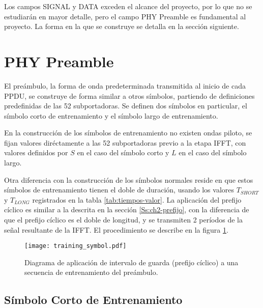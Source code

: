 Los campos SIGNAL y DATA exceden el alcance del proyecto, por lo que no se estudiarán en mayor detalle, pero el campo PHY Preamble es fundamental al proyecto. La forma en la que se construye se detalla en la sección siguiente.

\section{PHY Preamble}
\label{S:ch2-preambulo}

El preámbulo, la forma de onda predeterminada transmitida al inicio de cada PPDU, se construye de forma similar a otros símbolos, partiendo de definiciones predefinidas de las 52 subportadoras. Se definen dos símbolos en particular, el símbolo corto de entrenamiento y el símbolo largo de entrenamiento.

En la construcción de los símbolos de entrenamiento no existen ondas piloto, se fijan valores diréctamente a las 52 subportadoras previo a la etapa IFFT, con valores definidos por $S$ en el caso del símbolo corto y $L$ en el caso del símbolo largo.

Otra diferencia con la construcción de los símbolos normales reside en que estos símbolos de entrenamiento tienen el doble de duración, usando los valores $T_{SHORT}$ y $T_{LONG}$ registrados en la tabla \ref{tab:tiempos-valor}. La aplicación del prefijo cíclico es similar a la descrita en la sección \ref{Ss:ch2-prefijo}, con la diferencia de que el prefijo cíclico es el doble de longitud, y se transmiten 2 períodos de la señal resultante de la IFFT. El procedimiento se describe en la figura \ref{fig:training-symbol}.\\
\begin{figure}[ht]
    \centering{}\texttt{[image: training\_symbol.pdf]}
    \caption{Diagrama de aplicación de intervalo de guarda (prefijo cíclico) a una secuencia de entrenamiento del preámbulo.\label{fig:training-symbol}}  
\end{figure}


\subsection{Símbolo Corto de Entrenamiento}
\label{Ss:ch2-short}

